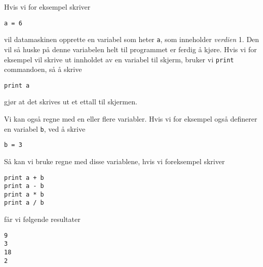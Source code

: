 \documentclass[a4paper, 11pt, notitlepage, english]{article}
\begin{document}
Hvis vi for eksempel skriver
\begin{lstlisting}
a = 6
\end{lstlisting}
\vspace{-0.3cm}
vil datamaskinen opprette en variabel som heter \verb+a+, som inneholder \emph{verdien} 1. Den vil så huske på denne variabelen helt til programmet er ferdig å kjøre. Hvis vi for eksempel vil skrive ut innholdet av en variabel til skjerm, bruker vi \verb+print+ commandoen, så å skrive
\begin{lstlisting}
print a
\end{lstlisting}
\vspace{-0.3cm}
gjør at det skrives ut et ettall til skjermen.

Vi kan også regne med en eller flere variabler. Hvis vi for eksempel også definerer en variabel \verb+b+, ved å skrive
\begin{lstlisting}
b = 3
\end{lstlisting}
\vspace{-0.3cm}
Så kan vi bruke regne med disse variablene, hvis vi foreksempel skriver
\begin{lstlisting}
print a + b
print a - b
print a * b
print a / b
\end{lstlisting}
\vspace{-0.3cm}
får vi følgende resultater
\begin{lstlisting}
9
3
18
2
\end{lstlisting}
\vspace{-0.3cm}
\end{document}
